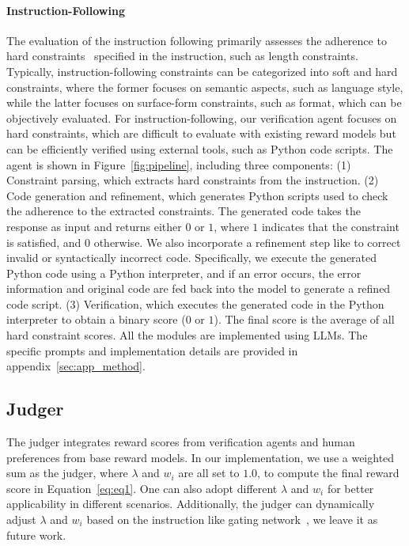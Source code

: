 
\paragraph{Instruction-Following}
The evaluation of the instruction following primarily assesses the adherence to hard constraints~\citep{zhou2023instruction} specified in the instruction, such as length constraints. 
Typically, instruction-following constraints can be categorized into soft and hard constraints, where the former focuses on semantic aspects, such as language style, while the latter focuses on surface-form constraints, such as format, which can be objectively evaluated. For instruction-following, our verification agent focuses on hard constraints, which are difficult to evaluate with existing reward models but can be efficiently verified using external tools, such as Python code scripts.
The agent is shown in Figure~\ref{fig:pipeline}, including three components:
(1) Constraint parsing, which extracts hard constraints from the instruction.
(2) Code generation and refinement, which generates Python scripts used to check the adherence to the extracted constraints. The generated code takes the response as input and returns either $0$ or $1$, where $1$ indicates that the constraint is satisfied, and $0$ otherwise.
We also incorporate a refinement step like \citet{madaan2024self} to correct invalid or syntactically incorrect code. Specifically, we execute the generated Python code using a Python interpreter, and if an error occurs, the error information and original code are fed back into the model to generate a refined code script.
(3) Verification, which executes the generated code in the Python interpreter to obtain a binary score ($0$ or $1$). The final score is the average of all hard constraint scores.
All the modules are implemented using LLMs. The specific prompts and implementation details are provided in appendix~\ref{sec:app_method}.



\subsection{Judger}
\label{sec:judger}
The judger integrates reward scores from verification agents and human preferences from base reward models. In our implementation, we use a weighted sum as the judger, where $\lambda$ and $w_i$ are all set to $1.0$, to compute the final reward score in Equation~\ref{eq:eq1}. One can also adopt different $\lambda$ and $w_i$ for better applicability in different scenarios. Additionally, the judger can dynamically adjust $\lambda$ and $w_i$ based on the instruction like gating network~\citep{wang2024interpretable}, we leave it as future work.

